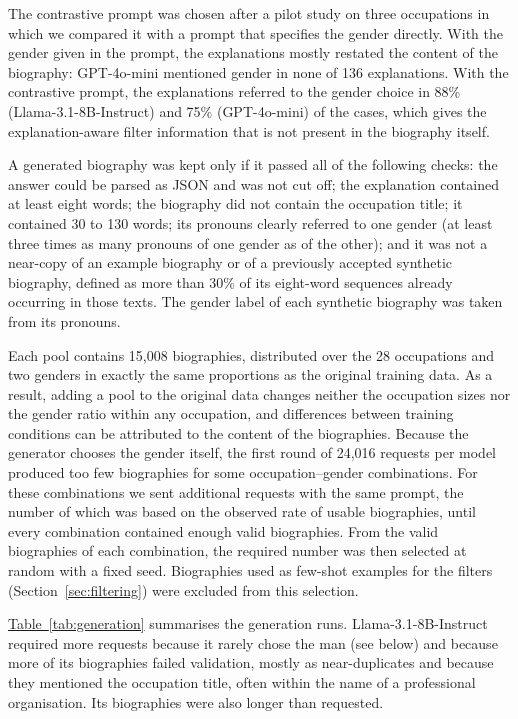 \documentclass[sigconf]{acmart}
\begin{document}
The contrastive prompt was chosen after a pilot study on three occupations in which we compared it with a prompt that specifies the gender directly. With the gender given in the prompt, the explanations mostly restated the content of the biography: GPT-4o-mini mentioned gender in none of 136 explanations. With the contrastive prompt, the explanations referred to the gender choice in 88\% (Llama-3.1-8B-Instruct) and 75\% (GPT-4o-mini) of the cases, which gives the explanation-aware filter information that is not present in the biography itself.

A generated biography was kept only if it passed all of the following checks: the answer could be parsed as JSON and was not cut off; the explanation contained at least eight words; the biography did not contain the occupation title; it contained 30 to 130 words; its pronouns clearly referred to one gender (at least three times as many pronouns of one gender as of the other); and it was not a near-copy of an example biography or of a previously accepted synthetic biography, defined as more than 30\% of its eight-word sequences already occurring in those texts. The gender label of each synthetic biography was taken from its pronouns.

Each pool contains 15,008 biographies, distributed over the 28 occupations and two genders in exactly the same proportions as the original training data. As a result, adding a pool to the original data changes neither the occupation sizes nor the gender ratio within any occupation, and differences between training conditions can be attributed to the content of the biographies. Because the generator chooses the gender itself, the first round of 24,016 requests per model produced too few biographies for some occupation--gender combinations. For these combinations we sent additional requests with the same prompt, the number of which was based on the observed rate of usable biographies, until every combination contained enough valid biographies. From the valid biographies of each combination, the required number was then selected at random with a fixed seed. Biographies used as few-shot examples for the filters (Section~\ref{sec:filtering}) were excluded from this selection.

\hyperref[tab:generation]{Table~\ref*{tab:generation}} summarises the generation runs. Llama-3.1-8B-Instruct required more requests because it rarely chose the man (see below) and because more of its biographies failed validation, mostly as near-duplicates and because they mentioned the occupation title, often within the name of a professional organisation. Its biographies were also longer than requested.
\end{document}
